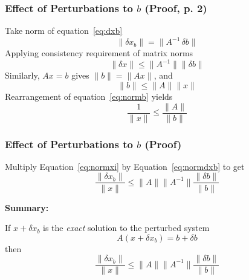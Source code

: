 \documentclass[10pt]{beamer}
\newcommand{\norm}[1]{{\ensuremath{{\|#1\|}}}}
\begin{document}
\begin{frame}
\frametitle{Effect of Perturbations to $b$ (Proof, p. 2)}

Take norm of equation~\eqref{eq:dxb}
\begin{equation*}
    \norm{\delta x_b} = \norm{A^{-1}\,\delta b}
\end{equation*}
Applying consistency requirement of matrix norms
\begin{equation}   \label{eq:normdxb}
    \norm{\delta x} \le \norm{A^{-1}}\norm{\delta b}
\end{equation}
Similarly, $Ax=b$ gives $\norm{b} = \norm{Ax}$, and
\begin{equation}   \label{eq:normb}
    \norm{b} \le \norm{A}\norm{x}
\end{equation}
Rearrangement of equation~\eqref{eq:normb} yields
\begin{equation}     \label{eq:normxi}
    \frac{1}{\norm{x}} \le \frac{\norm{A}}{\norm{b}}
\end{equation}

\end{frame}
\begin{frame}
\frametitle{Effect of Perturbations to $b$ (Proof)}


Multiply Equation~\eqref{eq:normxi} by Equation~\eqref{eq:normdxb} to get
\begin{equation}    \label{eq:dxbonx}
    \frac{\norm{\delta x_b}}{\norm{x}} \le \norm{A}\norm{A^{-1}} \frac{\norm{\delta b}}{{\norm{b}}}
\end{equation}

\begin{center}
\begin{minipage}{0.75\textwidth}
\textbf{Summary:}\par\vspace{1ex}
If $x + \delta x_b$ is the \emph{exact} solution to the perturbed system
\begin{equation*}
    A (x + \delta x_b) = b + \delta b
\end{equation*}
then
\begin{equation*}
    \frac{\norm{\delta x_b}}{\norm{x}} \le \norm{A}\norm{A^{-1}} \frac{\norm{\delta b}}{{\norm{b}}}
\end{equation*}
\end{minipage}
\end{center}

\end{frame}
\end{document}
